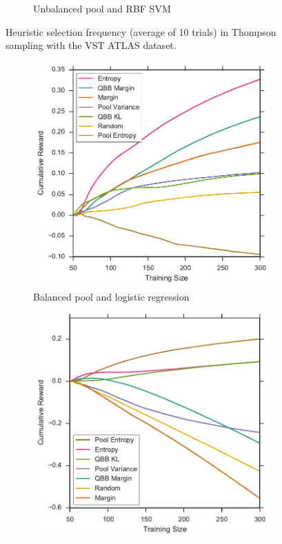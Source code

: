 \begin{figure}[p]
\begin{subfigure}{.5\textwidth}
		\caption{Unbalanced pool and RBF SVM}
		\label{fig:vstatlas_ur_frequencies}
	\end{subfigure}
	\caption[Heuristic selection frequency (VST ATLAS)]{
		Heuristic selection frequency (average of 10 trials) in Thompson sampling with the VST ATLAS dataset.}
	\label{fig:vstatlas_frequencies}
\end{figure}


\begin{figure}[p]
	\centering
	\begin{subfigure}{.5\textwidth}
		\centering
		\includegraphics[width=\textwidth]{figures/5_thompson/vstatlas_bl_sum_rewards}
		\caption{Balanced pool and logistic regression}
		\label{fig:vstatlas_bl_sum_rewards}
	\end{subfigure}%
	\begin{subfigure}{.5\textwidth}
		\centering
		\includegraphics[width=\linewidth]{figures/5_thompson/vstatlas_br_sum_rewards}

\end{subfigure}
\end{figure}
